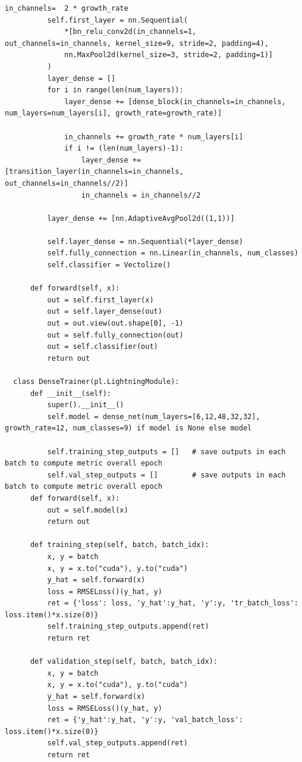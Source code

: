 \documentclass[a4paper,11pt,dvipdfmx]{jreport}
\begin{document}
\begin{lstlisting}[caption=印象判定用NN{,} DenseNetに関するソースコード, label=source]
          in_channels=  2 * growth_rate
          self.first_layer = nn.Sequential(
              *[bn_relu_conv2d(in_channels=1, out_channels=in_channels, kernel_size=9, stride=2, padding=4),
              nn.MaxPool2d(kernel_size=3, stride=2, padding=1)]
          )
          layer_dense = []
          for i in range(len(num_layers)):
              layer_dense += [dense_block(in_channels=in_channels, num_layers=num_layers[i], growth_rate=growth_rate)]
  
              in_channels += growth_rate * num_layers[i]
              if i != (len(num_layers)-1):
                  layer_dense += [transition_layer(in_channels=in_channels, out_channels=in_channels//2)]
                  in_channels = in_channels//2
  
          layer_dense += [nn.AdaptiveAvgPool2d((1,1))]
  
          self.layer_dense = nn.Sequential(*layer_dense)
          self.fully_connection = nn.Linear(in_channels, num_classes)
          self.classifier = Vectolize()
  
      def forward(self, x):
          out = self.first_layer(x)
          out = self.layer_dense(out)
          out = out.view(out.shape[0], -1)
          out = self.fully_connection(out)
          out = self.classifier(out)
          return out
  
  class DenseTrainer(pl.LightningModule):
      def __init__(self):
          super().__init__()
          self.model = dense_net(num_layers=[6,12,48,32,32], growth_rate=12, num_classes=9) if model is None else model
  
          self.training_step_outputs = []   # save outputs in each batch to compute metric overall epoch
          self.val_step_outputs = []        # save outputs in each batch to compute metric overall epoch
      def forward(self, x):
          out = self.model(x)
          return out
  
      def training_step(self, batch, batch_idx):
          x, y = batch
          x, y = x.to("cuda"), y.to("cuda")
          y_hat = self.forward(x)
          loss = RMSELoss()(y_hat, y)
          ret = {'loss': loss, 'y_hat':y_hat, 'y':y, 'tr_batch_loss': loss.item()*x.size(0)}
          self.training_step_outputs.append(ret)
          return ret
  
      def validation_step(self, batch, batch_idx):
          x, y = batch
          x, y = x.to("cuda"), y.to("cuda")
          y_hat = self.forward(x)
          loss = RMSELoss()(y_hat, y)
          ret = {'y_hat':y_hat, 'y':y, 'val_batch_loss': loss.item()*x.size(0)}
          self.val_step_outputs.append(ret)
          return ret
  

\end{lstlisting}
\end{document}
